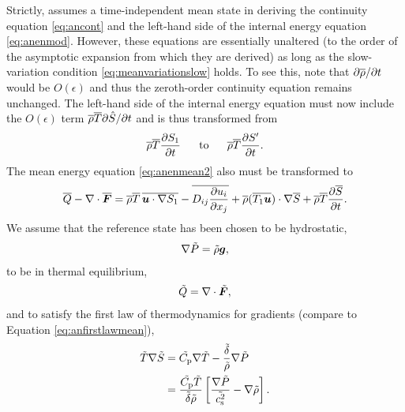 \documentclass[12pt]{article}
\newcommand{\vecf}{\bm{F}}
\begin{document}
Strictly, \citet{Gough1969} assumes a time-independent mean state in deriving the continuity equation \eqref{eq:ancont} and the left-hand side of the internal energy equation \eqref{eq:anenmod}. However, these equations are essentially unaltered (to the order of the asymptotic expansion from which they are derived) as long as the slow-variation condition \eqref{eq:meanvariationslow} holds. To see this, note that $\partial\overline{\rho}/\partial t$ would be $O(\epsilon)$ and thus the zeroth-order continuity equation remains unchanged. The left-hand side of the internal energy equation must now include the $O(\epsilon)$ term $\overline{\rho}\overline{T} \partial\hat{S}/\partial t$ and is thus transformed from
\begin{align}\label{eq:anenmodlhs}
	\overline{\rho}\overline{T}\frac{\partial S_1}{\partial t}\ \ \ \ \ \text{to}\ \ \ \ \   \overline{\rho}\overline{T}\frac{\partial S^\prime}{\partial t}.
\end{align}
The mean energy equation \eqref{eq:anenmean2} also must be transformed to
\begin{align}\label{eq:anenmean3}
	\heatover-\Div\overline{\vecf} = \rhoover\tmpover\, \overline{\ugrad \entrone}-\overline{D_{ij}\pderiv{u_i}{x_j}} + \rhoover (\overline{\tmpone\vecu})\dotgrad\entrover + \rhoover\tmpover\pderiv{\entrover}{t}.
\end{align}
We assume that the reference state has been chosen to be hydrostatic,
\begin{align}\label{eq:refhydro}
	\nabla \tilde{P} = \tilde{\rho}\bm{g},
\end{align}
to be in thermal equilibrium,
\begin{align}\label{eq:refthermalequil}
	\tilde{Q} = \Div\tilde{\vecf},
\end{align}
and to satisfy the first law of thermodynamics for gradients (compare to Equation \eqref{eq:anfirstlawmean}),
\begin{subequations}\label{eq:anfirstlawref}
	\begin{align}
		\tilde{T}\nabla\tilde{S} &= \tilde{C_{\rm{p}}}\nabla\tilde{T} - \frac{\tilde{\delta}}{\tilde{\rho}}\nabla\tilde{P} \\
		&= \frac{\tilde{C_{\rm{p}}}\tilde{T}}{\tilde{\delta}\tilde{\rho}}\left[\frac{\nabla\tilde{P}}{\tilde{c_{\rm s}^2}}-\nabla\tilde{\rho}\right].
	\end{align}
\end{subequations}
\end{document}
